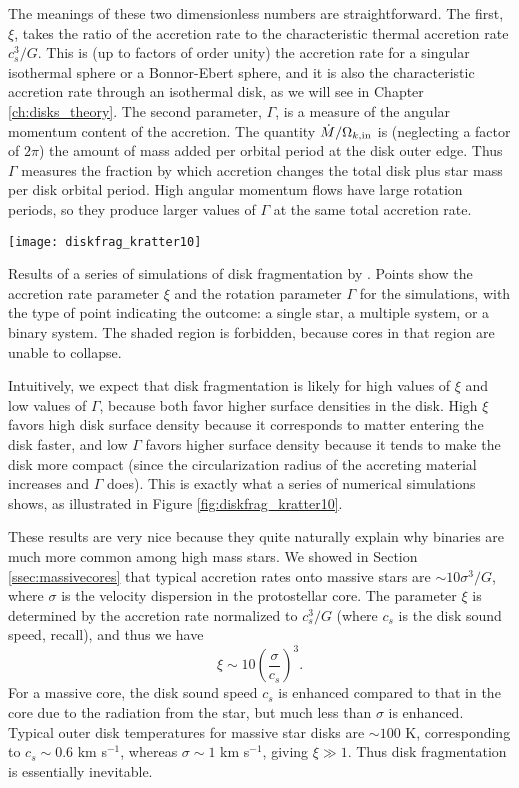 The meanings of these two dimensionless numbers are straightforward. The first, $\xi$, takes the ratio of the accretion rate to the characteristic thermal accretion rate $c_s^3/G$. This is (up to factors of order unity) the accretion rate for a singular isothermal sphere or a Bonnor-Ebert sphere, and it is also the characteristic accretion rate through an isothermal disk, as we will see in Chapter \ref{ch:disks_theory}. The second parameter, $\Gamma$, is a measure of the angular momentum content of the accretion. The quantity $\dot{M}/\Omega_{k,\rm in}$ is (neglecting a factor of $2\pi$) the amount of mass added per orbital period at the disk outer edge. Thus $\Gamma$ measures the fraction by which accretion changes the total disk plus star mass per disk orbital period. High angular momentum flows have large rotation periods, so they produce larger values of $\Gamma$ at the same total accretion rate.
\begin{marginfigure}
\texttt{[image: diskfrag\_kratter10]}
\caption[Parameter study of disk fragmentation]{
\label{fig:diskfrag_kratter10}
Results of a series of simulations of disk fragmentation by \citet{kratter10a}. Points show the accretion rate parameter $\xi$ and the rotation parameter $\Gamma$ for the simulations, with the type of point indicating the outcome: a single star, a multiple system, or a binary system. The shaded region is forbidden, because cores in that region are unable to collapse.
}
\end{marginfigure}

Intuitively, we expect that disk fragmentation is likely for high values of $\xi$ and low values of $\Gamma$, because both favor higher surface densities in the disk. High $\xi$ favors high disk surface density because it corresponds to matter entering the disk faster, and low $\Gamma$ favors higher surface density because it tends to make the disk more compact (since the circularization radius of the accreting material increases and $\Gamma$ does). This is exactly what a series of numerical simulations shows, as illustrated in Figure \ref{fig:diskfrag_kratter10}.

These results are very nice because they quite naturally explain why binaries are much more common among high mass stars. We showed in Section \ref{ssec:massivecores} that typical accretion rates onto massive stars are $\sim 10 \sigma^3/G$, where $\sigma$ is the velocity dispersion in the protostellar core. The parameter $\xi$ is determined by the accretion rate normalized to $c_s^3/G$ (where $c_s$ is the disk sound speed, recall), and thus we have
\begin{equation}
\xi \sim 10\left(\frac{\sigma}{c_s}\right)^3.
\end{equation}
For a massive core, the disk sound speed $c_s$ is enhanced compared to that in the core due to the radiation from the star, but much less than $\sigma$ is enhanced. Typical outer disk temperatures for massive star disks are $\sim 100$ K, corresponding to $c_s \sim 0.6$ km s$^{-1}$, whereas $\sigma \sim 1$ km s$^{-1}$, giving $\xi \gg 1$. Thus disk fragmentation is essentially inevitable.

